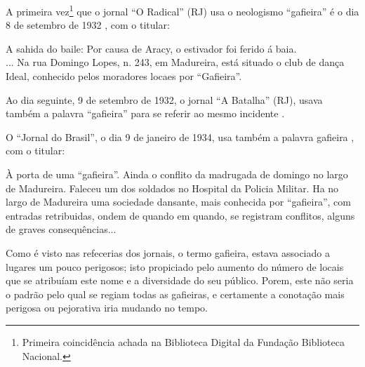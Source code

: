A primeira vez\footnote{Primeira coincidência achada na Biblioteca Digital da Fundação Biblioteca Nacional.} 
que o jornal ``O Radical'' (RJ) usa o neologismo ``gafieira'' 
é o dia 8 de setembro de 1932 \cite[pp. 12]{gafieirajournaloradical1},
com o titular:
\begin{tcolorbox}[colback=lowgray,colframe=lowgray]%
A sahida do baile: Por causa de Aracy, o estivador foi ferido á baia.\\
... Na rua Domingo Lopes, n. 243, em Madureira, está situado o club de dança Ideal, 
conhecido pelos moradores locaes por ``Gafieira''.
\end{tcolorbox} 
Ao dia seguinte, 9 de setembro de 1932, o jornal ``A Batalha'' (RJ), 
usava também a palavra ``gafieira'' para se referir ao mesmo incidente \cite[pp. 8]{gafieirajournalabatalha1}.

O ``Jornal do Brasil'', o dia 9 de janeiro de 1934, 
usa também a palavra gafieira \cite[pp. 11]{gafieirajournalbrasil1}, com o titular:
\begin{tcolorbox}[colback=lowgray,colframe=lowgray]%
À porta de uma ``gafieira''.
Ainda o conflito da madrugada de domingo no largo de Madureira.
Faleceu um dos soldados no Hospital da Policia Militar. 
Ha no largo de Madureira uma sociedade dansante, mais conhecida por ``gafieira'', 
com entradas retribuidas, ondem de quando em quando, se registram conflitos, 
alguns de graves consequências...
\end{tcolorbox} 
Como é visto nas refecerias dos jornais, 
o termo gafieira, estava associado a lugares um pouco perigosos;
isto propiciado pelo aumento do número de locais que se atribuíam este nome e a diversidade do seu público.
Porem, este não seria o padrão pelo qual se regiam todas as gafieiras, 
e certamente a conotação mais perigosa ou pejorativa iria mudando no tempo. 



